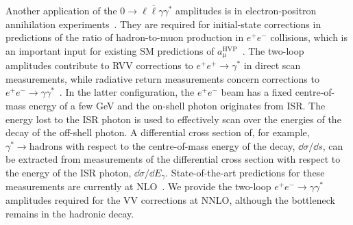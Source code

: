 \documentclass[main.tex]{subfiles}
\begin{document}
Another application of the $0\to \ell \bar\ell \gamma \gamma^*$ amplitudes is in electron-positron annihilation experiments~\cite{precisionsm}.
They are required for initial-state corrections in predictions of the ratio of hadron-to-muon production in $e^+e^-$ collisions, which is an important input for existing SM predictions of $a^{\text{HVP}}_\mu$~\cite{Abbiendi:2022liz}.
The two-loop amplitudes contribute to \ac{RVV} corrections to $e^+e^+\to\gamma^*$ in direct scan measurements, while radiative return measurements concern corrections to $e^+e^-\to\gamma\gamma^*$~\cite{Aoyama:2020ynm}.
In the latter configuration, the $e^+e^-$ beam has a fixed centre-of-mass energy of a few GeV and the on-shell photon originates from \ac{ISR}.
The energy lost to the \ac{ISR} photon is used to effectively scan over the energies of the decay of the off-shell photon.
A differential cross section of, for example, $\gamma^*\to\text{hadrons}$ with respect to the centre-of-mass energy of the decay, $\dd\sigma/\dd s$, can be extracted from measurements of the differential cross section with respect to the energy of the \ac{ISR} photon, $\dd\sigma/\dd E_\gamma$.
State-of-the-art predictions for these measurements are currently at NLO~\cite{Abbiendi:2022liz}.
We provide the two-loop $e^+e^-\to\gamma\gamma^*$ amplitudes required for the \ac{VV} corrections at NNLO, although the bottleneck remains in the hadronic decay.
\end{document}
